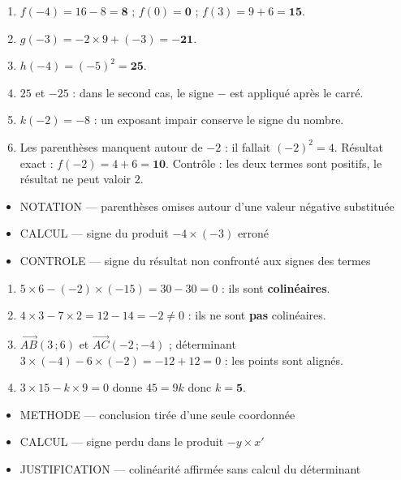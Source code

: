 \documentclass[10pt,a4paper]{article}
\begin{document}
\begin{enumerate}
\item $f(-4)=16-8=\mathbf{8}$ ; $f(0)=\mathbf{0}$ ; $f(3)=9+6=\mathbf{15}$.
\item $g(-3)=-2\times 9 + (-3) = \mathbf{-21}$.
\item $h(-4)=(-5)^2=\mathbf{25}$.
\item $25$ et $-25$ : dans le second cas, le signe $-$ est appliqué après le carré.
\item $k(-2)=-8$ : un exposant impair conserve le signe du nombre.
\item Les parenthèses manquent autour de $-2$ : il fallait $(-2)^2 = 4$. Résultat exact : $f(-2)=4+6=\mathbf{10}$. Contrôle : les deux termes sont positifs, le résultat ne peut valoir $2$.
\end{enumerate}
\begin{itemize}
\item \textsc{NOTATION} --- parenthèses omises autour d'une valeur négative substituée
\item \textsc{CALCUL} --- signe du produit $-4\times(-3)$ erroné
\item \textsc{CONTROLE} --- signe du résultat non confronté aux signes des termes
\end{itemize}
\begin{enumerate}
\item $5\times 6 - (-2)\times(-15) = 30 - 30 = 0$ : ils sont \textbf{colinéaires}.
\item $4\times 3 - 7\times 2 = 12 - 14 = -2 \neq 0$ : ils ne sont \textbf{pas} colinéaires.
\item $\vec{AB}(3\,;6)$ et $\vec{AC}(-2\,;-4)$ ; déterminant $3\times(-4)-6\times(-2)=-12+12=0$ : les points sont alignés.
\item $3\times 15 - k\times 9 = 0$ donne $45 = 9k$ donc $k = \mathbf{5}$.
\end{enumerate}
\begin{itemize}
\item \textsc{METHODE} --- conclusion tirée d'une seule coordonnée
\item \textsc{CALCUL} --- signe perdu dans le produit $-y\times x'$
\item \textsc{JUSTIFICATION} --- colinéarité affirmée sans calcul du déterminant
\end{itemize}
\end{document}
